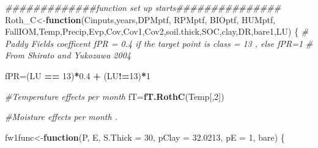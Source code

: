 \documentclass[
  10pt,
  b5paper,
]{book}
\newenvironment{Shaded}{\begin{snugshade}}{\end{snugshade}}
\newcommand{\CommentTok}[1]{\textcolor[rgb]{0.56,0.35,0.01}{\textit{#1}}}
\newcommand{\ControlFlowTok}[1]{\textcolor[rgb]{0.13,0.29,0.53}{\textbf{#1}}}
\newcommand{\DataTypeTok}[1]{\textcolor[rgb]{0.13,0.29,0.53}{#1}}
\newcommand{\DecValTok}[1]{\textcolor[rgb]{0.00,0.00,0.81}{#1}}
\newcommand{\FloatTok}[1]{\textcolor[rgb]{0.00,0.00,0.81}{#1}}
\newcommand{\KeywordTok}[1]{\textcolor[rgb]{0.13,0.29,0.53}{\textbf{#1}}}
\newcommand{\NormalTok}[1]{#1}
\newcommand{\OperatorTok}[1]{\textcolor[rgb]{0.81,0.36,0.00}{\textbf{#1}}}
\newcommand{\StringTok}[1]{\textcolor[rgb]{0.31,0.60,0.02}{#1}}
\begin{document}
\begin{Shaded}
\begin{Highlighting}[]
\CommentTok{#############function set up starts###############}
\NormalTok{Roth_C<-}\ControlFlowTok{function}\NormalTok{(Cinputs,years,DPMptf, RPMptf, BIOptf, HUMptf, FallIOM,Temp,Precip,Evp,Cov,Cov1,Cov2,soil.thick,SOC,clay,DR,bare1,LU)}
\NormalTok{\{}
\CommentTok{# Paddy Fields coefficent fPR = 0.4 if the target point is class = 13 , else fPR=1}
\CommentTok{# From Shirato and Yukozawa 2004}

\NormalTok{fPR=(LU }\OperatorTok{==}\StringTok{ }\DecValTok{13}\NormalTok{)}\OperatorTok{*}\FloatTok{0.4} \OperatorTok{+}\StringTok{ }\NormalTok{(LU}\OperatorTok{!=}\DecValTok{13}\NormalTok{)}\OperatorTok{*}\DecValTok{1}

\CommentTok{#Temperature effects per month}
\NormalTok{fT=}\KeywordTok{fT.RothC}\NormalTok{(Temp[,}\DecValTok{2}\NormalTok{]) }

\CommentTok{#Moisture effects per month . }

\NormalTok{fw1func<-}\ControlFlowTok{function}\NormalTok{(P, E, }\DataTypeTok{S.Thick =} \DecValTok{30}\NormalTok{, }\DataTypeTok{pClay =} \FloatTok{32.0213}\NormalTok{, }\DataTypeTok{pE =} \DecValTok{1}\NormalTok{, bare) }
\NormalTok{\{}
   

\end{Highlighting}
\end{Shaded}
\end{document}
